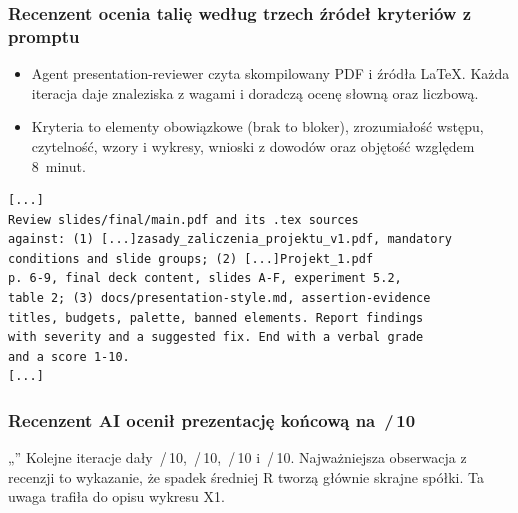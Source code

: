 

\begin{frame}[fragile]
  \frametitle{Recenzent ocenia talię według trzech źródeł kryteriów z promptu}
  \begin{itemize}
    \item Agent presentation-reviewer czyta skompilowany PDF i źródła LaTeX.
      Każda iteracja daje znaleziska z wagami i doradczą ocenę słowną
      oraz liczbową.
    \item Kryteria to elementy obowiązkowe (brak to bloker), zrozumiałość
      wstępu, czytelność, wzory i wykresy, wnioski z dowodów oraz objętość
      względem 8~minut.
  \end{itemize}
  {\footnotesize
\begin{verbatim}
[...]
Review slides/final/main.pdf and its .tex sources
against: (1) [...]zasady_zaliczenia_projektu_v1.pdf, mandatory
conditions and slide groups; (2) [...]Projekt_1.pdf
p. 6-9, final deck content, slides A-F, experiment 5.2,
table 2; (3) docs/presentation-style.md, assertion-evidence
titles, budgets, palette, banned elements. Report findings
with severity and a suggested fix. End with a verbal grade
and a score 1-10.
[...]
\end{verbatim}}
\end{frame}

\begin{frame}
  \frametitle{Recenzent AI ocenił prezentację końcową na \resReviewScore{}\,/\,10}
  „\resReviewVerbal''
  \vskip3mm
  Kolejne iteracje dały \resReviewFirstScore{}\,/\,10,
  \resReviewSecondScore{}\,/\,10, \resReviewThirdScore{}\,/\,10
  i \resReviewScore{}\,/\,10.
  Najważniejsza obserwacja z recenzji to wykazanie, że spadek średniej R
  tworzą głównie skrajne spółki. Ta uwaga trafiła do opisu wykresu X1.
\end{frame}
